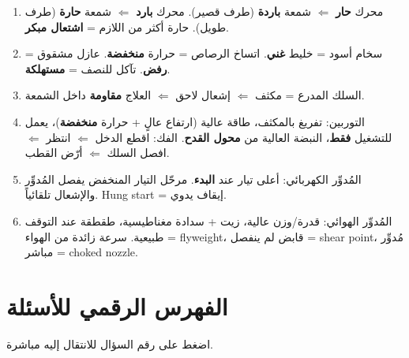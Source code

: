 \documentclass[11pt,a4paper]{article}
\newcommand{\en}[1]{\textenglish{#1}}
\begin{document}
\begin{enumerate}[label=\arabic*.]
  \item محرك \textbf{حار} $\Leftarrow$ شمعة \textbf{باردة} (طرف قصير). محرك \textbf{بارد} $\Leftarrow$ شمعة \textbf{حارة} (طرف طويل). حارة أكثر من اللازم = \textbf{اشتعال مبكر}.
  \item سخام أسود = خليط \textbf{غني}. اتساخ الرصاص = حرارة \textbf{منخفضة}. عازل مشقوق = \textbf{رفض}. تآكل للنصف = \textbf{مستهلكة}.
  \item السلك المدرع = مكثف $\Leftarrow$ إشعال لاحق $\Leftarrow$ العلاج \textbf{مقاومة} داخل الشمعة.
  \item التوربين: تفريغ بالمكثف، طاقة عالية (ارتفاع عالٍ + حرارة \textbf{منخفضة})، يعمل للتشغيل \textbf{فقط}، النبضة العالية من \textbf{محول القدح}. الفك: اقطع الدخل $\Leftarrow$ انتظر $\Leftarrow$ افصل السلك $\Leftarrow$ أرّض القطب.
  \item المُدوِّر الكهربائي: أعلى تيار عند \textbf{البدء}. مرحّل التيار المنخفض يفصل المُدوِّر والإشعال تلقائياً. \en{Hung start} = إيقاف يدوي.
  \item المُدوِّر الهوائي: قدرة/وزن عالية، زيت + سدادة مغناطيسية، طقطقة عند التوقف طبيعية. سرعة زائدة من الهواء = \en{flyweight}، قابض لم ينفصل = \en{shear point}، مُدوِّر مباشر = \en{choked nozzle}.
\end{enumerate}

\newpage
\section{الفهرس الرقمي للأسئلة}
اضغط على رقم السؤال للانتقال إليه مباشرة.
\end{document}
